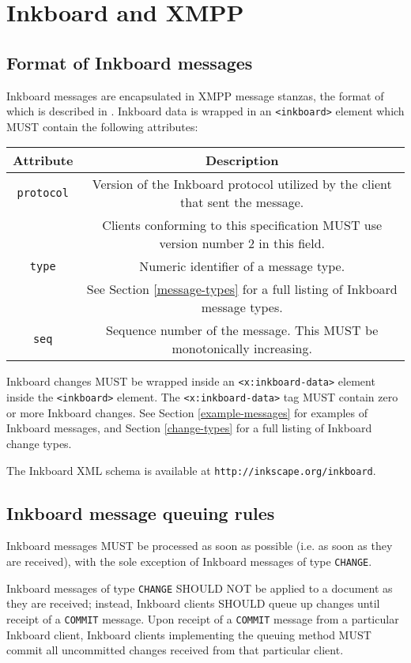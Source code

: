 \documentclass[11pt]{article}
\begin{document}
\section{Inkboard and XMPP}
\subsection{Format of Inkboard messages}
Inkboard messages are encapsulated in XMPP message stanzas, the format of which is described in \cite{rfc3920}.  Inkboard data is wrapped in an \texttt{<inkboard>} element which MUST contain the following attributes:
\begin{center}
\begin{tabular}[t]{|c|c|}
\hline
Attribute & Description \\
\hline
\texttt{protocol} & Version of the Inkboard protocol utilized by the client that sent the message.\\
& Clients conforming to this specification MUST use version number 2 in this field. \\
\hline
\texttt{type} & Numeric identifier of a message type. \\
&  See Section \ref{message-types} for a full listing of Inkboard message types. \\
\hline
\texttt{seq} & Sequence number of the message.  This MUST be monotonically increasing.  \\
\hline
\end{tabular}
\end{center}

Inkboard changes MUST be wrapped inside an \texttt{<x:inkboard-data>} element inside the \texttt{<inkboard>} element.  The \texttt{<x:inkboard-data>} tag MUST contain zero or more Inkboard changes.  See Section \ref{example-messages} for examples of Inkboard messages, and Section \ref{change-types} for a full listing of Inkboard change types.

The Inkboard XML schema is available at \texttt{http://inkscape.org/inkboard}.  

\subsection{Inkboard message queuing rules}
Inkboard messages MUST be processed as soon as possible (i.e. as soon as they are received), with the sole exception of Inkboard messages of type \texttt{CHANGE}.

Inkboard messages of type \texttt{CHANGE} SHOULD NOT be applied to a document as they are received; instead, Inkboard clients SHOULD queue up changes until receipt of a \texttt{COMMIT} message.  Upon receipt of a \texttt{COMMIT} message from a particular Inkboard client, Inkboard clients implementing the queuing method MUST commit all uncommitted changes received from that particular client.
\end{document}
